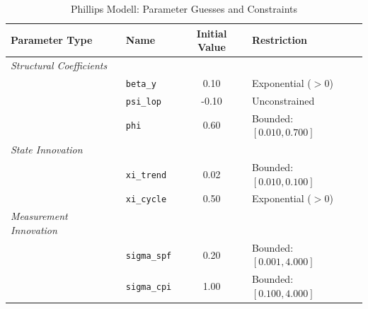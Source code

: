 \begin{table}[htbp]
\centering
\caption{Phillips Modell: Parameter Guesses and Constraints}
\label{tab:phillips_model_ssm_specs}
\begin{tabular}{llcl}
\hline\hline
\textbf{Parameter Type} & \textbf{Name} & \textbf{Initial Value} & \textbf{Restriction} \\ \hline
\textit{Structural Coefficients} &&& \\
    & \texttt{beta\_y} & 0.10 & Exponential ($>0$) \\
    & \texttt{psi\_lop} & -0.10 & Unconstrained \\
    & \texttt{phi} & 0.60 & Bounded: $[0.010, 0.700]$ \\
\hline
\textit{State Innovation} &&& \\
    & \texttt{xi\_trend} & 0.02 & Bounded: $[0.010, 0.100]$ \\
    & \texttt{xi\_cycle} & 0.50 & Exponential ($>0$) \\
\hline
\textit{Measurement Innovation} &&& \\
    & \texttt{sigma\_spf} & 0.20 & Bounded: $[0.001, 4.000]$ \\
    & \texttt{sigma\_cpi} & 1.00 & Bounded: $[0.100, 4.000]$ \\
\hline\hline
\end{tabular}
\end{table}
